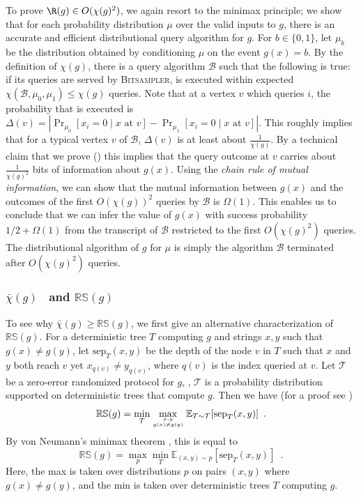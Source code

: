 \documentclass{toc}
\newcommand{\clB}{\mathcal{B}}
\newcommand{\clT}{\mathcal{T}}
\newcommand{\RS}{\mathbb{RS}}
\newcommand{\sep}{\mathrm{sep}}
\newcommand{\E}{\mathbb{E}}
\begin{document}
To prove $\R(g) \in O(\chi(g)^2)$, we again resort to the minimax principle; we show that for each probability distribution $\mu$ over the valid inputs to $g$, there is an 
accurate and efficient distributional query algorithm for $g$. For $b \in \{0,1\}$, let $\mu_b$ be the distribution obtained by conditioning $\mu$ on the event $g(x)=b$. By the definition of $\chi(g)$, there is a query algorithm $\clB$ 
such that the following is true: if its queries are served by \textsc{Bitsampler},  is executed within expected $\chi(\clB, \mu_0, \mu_1) \leq \chi(g)$ queries. Note that at a vertex $v$ which queries $i$, the probability that 
 is executed is $\Delta(v) = |\Pr_{\mu_0}[x_{i}=0 \mid x \mbox{ at } v] - \Pr_{\mu_1}[x_{i}=0 \mid x \mbox{ at } v]|$. This roughly implies that for a typical vertex $v$ of $\mathcal{B}$, $\Delta(v)$ is at least about $\frac{1}{\chi(g)}$. By a technical claim that we prove () this implies that 
the query outcome at $v$ carries about $\frac{1}{\chi(g)^2}$ bits of information about $g(x)$. Using the \emph{chain rule of mutual information}, we can show that the mutual information between $g(x)$ and the outcomes of the first 
$O(\chi(g))^2$ queries by $\clB$ is $\Omega(1)$. This enables us to conclude that we can infer the value of $g(x)$ with success probability $1/2 + \Omega(1)$ from the transcript of $\clB$ restricted to the first $O(\chi(g)^2)$ queries. 
The distributional algorithm of $g$ for $\mu$ is simply the algorithm $\clB$ terminated after $O(\chi(g)^2)$ queries.

%
\subsubsection{\texorpdfstring{$\bar \chi(g)$ \ and $\RS(g)$}{chi-bar(g) and
    RS(g)}}
To see why $\bar \chi(g) \ge \RS(g)$, we first give an alternative characterization of $\RS(g)$.  For a deterministic tree $T$ computing $g$ and strings $x,y$ such that $g(x) \ne g(y)$, let $\sep_T(x,y)$ be the depth of the node $v$ in $T$ 
such that $x$ and $y$ both reach $v$ yet $x_{q(v)} \ne y_{q(v)}$, where $q(v)$ is the index queried at $v$.  Let $\clT$ be a zero-error randomized protocol for $g$, \ie, $\clT$ is a probability distribution supported on deterministic trees 
that compute $g$.  Then we have (for a proof see )
\[
\RS(g) = \min_{\clT} \max_{x,y \atop g(x) \ne g(y)} \E_{T \sim \clT} [\sep_T(x,y)] \enspace .
\]
By von Neumann's minimax theorem \cite{vonNeumann}, this is equal to 
\[
\RS(g) = \max_{p} \min_T \E_{(x,y) \sim p} [\sep_T(x,y)] \enspace.
\]
Here, the max is taken over distributions $p$ on pairs $(x,y)$ where $g(x) \ne g(y)$, and the min is taken over deterministic trees $T$ computing $g$.  
\end{document}
